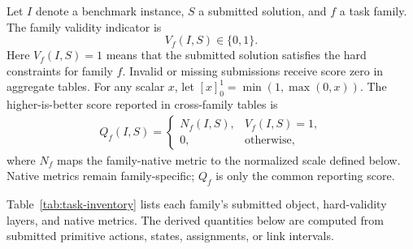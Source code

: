 \documentclass[11pt]{article}
\begin{document}
Let \(I\) denote a benchmark instance, \(S\) a submitted solution, and \(f\) a task family. The family validity indicator is
\[
  V_f(I,S)\in\{0,1\}.
\]
Here \(V_f(I,S)=1\) means that the submitted solution satisfies the hard constraints for family \(f\). Invalid or missing submissions receive score zero in aggregate tables. For any scalar \(x\), let \([x]_0^1=\min(1,\max(0,x))\). The higher-is-better score reported in cross-family tables is
\[
  \begin{aligned}
  Q_f(I,S)=
  \begin{cases}
    N_f(I,S), & V_f(I,S)=1,\\
    0, & \text{otherwise},
  \end{cases}
  \end{aligned}
\]
where \(N_f\) maps the family-native metric to the normalized scale defined below. Native metrics remain family-specific; \(Q_f\) is only the common reporting score.

Table~\ref{tab:task-inventory} lists each family's submitted object, hard-validity layers, and native metrics. The derived quantities below are computed from submitted primitive actions, states, assignments, or link intervals.
\end{document}
